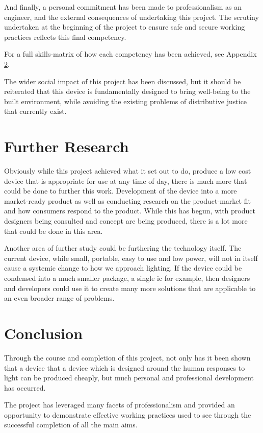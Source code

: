 And finally, a personal commitment has been made to professionalism as an engineer, and the external consequences of undertaking this project. The scrutiny undertaken at the beginning of the project to ensure safe and secure working practices reflects this final competency.

For a full skills-matrix of how each competency has been achieved, see Appendix \ref{}.

The wider social impact of this project has been discussed, but it should be reiterated that this device is fundamentally designed to bring well-being to the built environment, while avoiding the existing problems of distributive justice that currently exist.

\section{Further Research}

Obviously while this project achieved what it set out to do, produce a low cost device that is appropriate for use at any time of day, there is much more that could be done to further this work. Development of the device into a more market-ready product as well as conducting research on the product-market fit and how consumers respond to the product. While this has begun, with product designers being consulted and concept are being produced, there is a lot more that could be done in this area.

Another area of further study could be furthering the technology itself. The current device, while small, portable, easy to use and low power, will not in itself cause a systemic change to how we approach lighting. If the device could be condensed into a much smaller package, a single \acrshort{ic} for example, then designers and developers could use it to create many more solutions that are applicable to an even broader range of problems.

\section{Conclusion}

Through the course and completion of this project, not only has it been shown that a device that a device which is designed around the human responses to light can be produced cheaply, but much personal and professional development has occurred. 

The project has leveraged many facets of professionalism and provided an opportunity to demonstrate effective working practices used to see through the successful completion of all the main aims.

